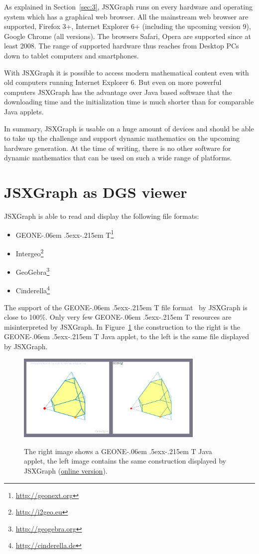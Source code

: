 \documentclass[12pt,a4paper]{article}%
\def\GEONExT{GEONE\kern-.06em \lower.5ex\hbox{x}\kern-.215em T}
\begin{document}
As explained in Section~\ref{sec:3}, JSXGraph runs on every hardware and operating system which has a graphical 
web browser. 
All the mainstream web browser are supported, Firefox 3+, Internet Explorer
6+ (including the upcoming version 9), Google Chrome (all versions). 
The browsers Safari, Opera are supported since at least 2008. 
The range of supported hardware thus reaches from Desktop PCs 
down to tablet computers and smartphones. 

With JSXGraph it is possible to access modern mathematical content even with old computers
running Internet Explorer 6.
But even on more powerful computers JSXGraph has the advantage over Java based software 
that the downloading time and the initialization time is much shorter than for comparable Java applets. 

In summary, JSXGraph is usable on a huge amount of devices and should be able to take up the challenge and support dynamic mathematics on the upcoming hardware generation.
At the time of writing, there is no other software for dynamic mathematics that can be used on such a wide range of 
platforms.


\section{JSXGraph as DGS viewer}
JSXGraph is able to read and display the following file formats:
\begin{itemize} 
\item \GEONExT{}\footnote{\href{http://geonext.org}{http://geonext.org}}
\item Intergeo\footnote{\href{http://i2geo.eu}{http://i2geo.eu}}
\item GeoGebra\footnote{\href{geogebra.org}{http://geogebra.org}}
\item Cinderella\footnote{\href{http://cinderella.de}{http://cinderella.de}}
\end{itemize}
The support of the \GEONExT{} file format~\cite{ehmann2003,ehmann2008} by JSXGraph is close to 100\%. 
Only very few \GEONExT{} resources are misinterpreted by JSXGraph. 
In Figure~\ref{fig:geonext} the construction to the right is the \GEONExT{} Java applet, to the left is the same file displayed by JSXGraph.
\begin{figure}[ht]
\begin{center}
\includegraphics[width=0.8\textwidth]{geonext.png}\\
\caption{The right image shows a \GEONExT{} Java applet, 
the left image contains the same construction displayed 
by JSXGraph
(\href{http://jsxgraph.uni-bayreuth.de/talks/cadgme10/talk/jsx_gxt.html}{online version}).}\label{fig:geonext}
\end{center}
\end{figure}
\end{document}
